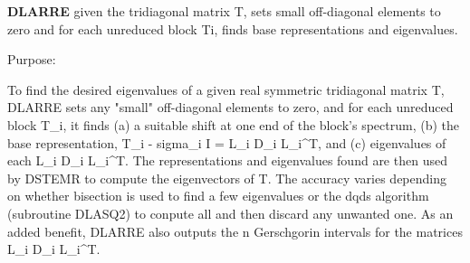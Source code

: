 {\bfseries D\+L\+A\+R\+R\+E} given the tridiagonal matrix T, sets small off-\/diagonal elements to zero and for each unreduced block Ti, finds base representations and eigenvalues. 

 \begin{DoxyParagraph}{Purpose\+: }
\begin{DoxyVerb} To find the desired eigenvalues of a given real symmetric
 tridiagonal matrix T, DLARRE sets any "small" off-diagonal
 elements to zero, and for each unreduced block T_i, it finds
 (a) a suitable shift at one end of the block's spectrum,
 (b) the base representation, T_i - sigma_i I = L_i D_i L_i^T, and
 (c) eigenvalues of each L_i D_i L_i^T.
 The representations and eigenvalues found are then used by
 DSTEMR to compute the eigenvectors of T.
 The accuracy varies depending on whether bisection is used to
 find a few eigenvalues or the dqds algorithm (subroutine DLASQ2) to
 conpute all and then discard any unwanted one.
 As an added benefit, DLARRE also outputs the n
 Gerschgorin intervals for the matrices L_i D_i L_i^T.\end{DoxyVerb}
 
\end{DoxyParagraph}

